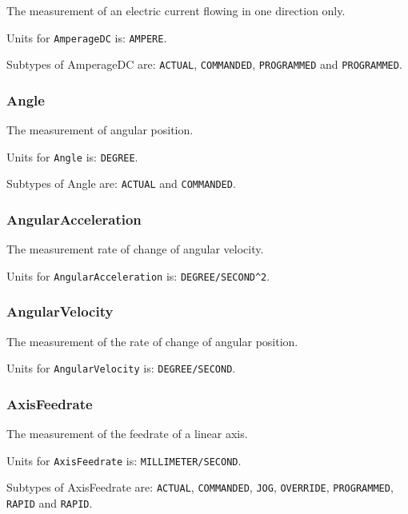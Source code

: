 The measurement of an electric current flowing in one direction only.


Units for \texttt{AmperageDC} is: \texttt{AMPERE}.


Subtypes of AmperageDC are: \texttt{ACTUAL}, \texttt{COMMANDED}, \texttt{PROGRAMMED} and \texttt{PROGRAMMED}. 
\FloatBarrier

\subsubsection{Angle}
  \label{sec:Angle}


The measurement of angular position.


Units for \texttt{Angle} is: \texttt{DEGREE}.


Subtypes of Angle are: \texttt{ACTUAL} and \texttt{COMMANDED}. 
\FloatBarrier

\subsubsection{AngularAcceleration}
  \label{sec:AngularAcceleration}


The measurement rate of change of angular velocity.


Units for \texttt{AngularAcceleration} is: \texttt{DEGREE/SECOND\^{}2}.

\FloatBarrier

\subsubsection{AngularVelocity}
  \label{sec:AngularVelocity}


The measurement of the rate of change of angular position.


Units for \texttt{AngularVelocity} is: \texttt{DEGREE/SECOND}.

\FloatBarrier

\subsubsection{AxisFeedrate}
  \label{sec:AxisFeedrate}


The measurement of the feedrate of a linear axis.


Units for \texttt{AxisFeedrate} is: \texttt{MILLIMETER/SECOND}.


Subtypes of AxisFeedrate are: \texttt{ACTUAL}, \texttt{COMMANDED}, \texttt{JOG}, \texttt{OVERRIDE}, \texttt{PROGRAMMED}, \texttt{RAPID} and \texttt{RAPID}. 
\FloatBarrier

